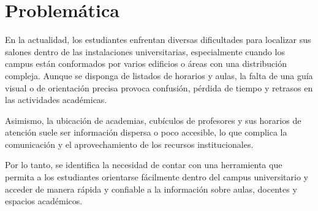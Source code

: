\section{Problemática}
En la actualidad, los estudiantes enfrentan diversas dificultades para localizar sus salones dentro de las instalaciones universitarias, especialmente cuando los campus están conformados por varios edificios o áreas con una distribución compleja. Aunque se disponga de listados de horarios y aulas, la falta de una guía visual o de orientación precisa provoca confusión, pérdida de tiempo y retrasos en las actividades académicas.

Asimismo, la ubicación de academias, cubículos de profesores y sus horarios de atención suele ser información dispersa o poco accesible, lo que complica la comunicación y el aprovechamiento de los recursos institucionales.

Por lo tanto, se identifica la necesidad de contar con una herramienta que permita a los estudiantes orientarse fácilmente dentro del campus universitario y acceder de manera rápida y confiable a la información sobre aulas, docentes y espacios académicos.